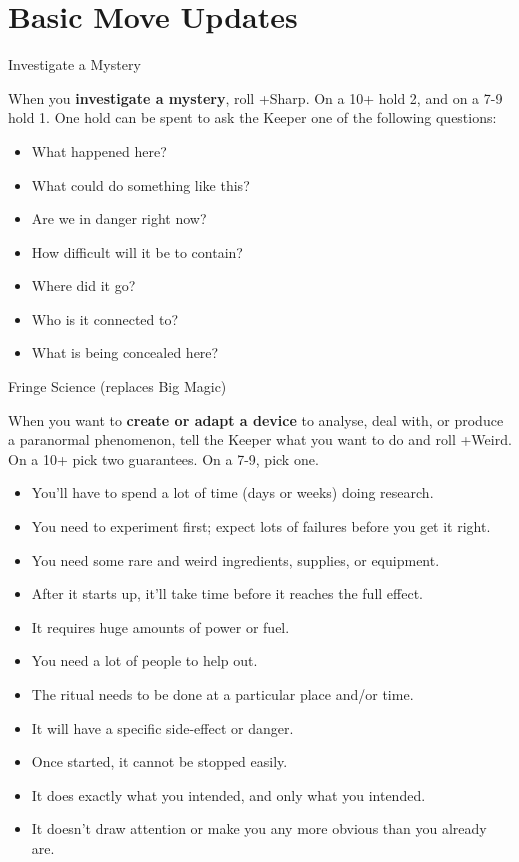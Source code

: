 \documentclass[12pt,oneside,landscape]{memoir}
\begin{document}
\chapter*{Basic Move Updates}
\begin{multicols}{4}
\move
{Investigate a Mystery}
{When you \textbf{investigate a mystery}, roll +Sharp. On a 10+ hold 2, and on a 7-9 hold 1. One hold can be spent to ask the Keeper one of the following questions:
\begin{itemize}
\item What happened here?
\item What could do something like this?
\item Are we in danger right now?
\item How difficult will it be to contain?
\item Where did it go?
\item Who is it connected to?
\item What is being concealed here?
\end{itemize}}


\move
{Fringe Science (replaces Big Magic)}
{When you want to \textbf{create or adapt a device} to analyse, deal with, or produce a paranormal phenomenon, tell the Keeper what you want to do and roll +Weird.  On a 10+ pick two guarantees.  On a 7-9, pick one.
\\[2mm]

\begin{itemize}
\item You’ll have to spend a lot of time (days or weeks) doing research.
\item You need to experiment first; expect lots of failures before you get it right.
\item You need some rare and weird ingredients, supplies, or equipment.
\item After it starts up, it’ll take time before it reaches the full effect.
\item It requires huge amounts of power or fuel.
\item You need a lot of people to help out.
\item The ritual needs to be done at a particular place and/or time.
\item It will have a specific side-effect or danger.
\end{itemize}

\begin{itemize}
\item Once started, it cannot be stopped easily.
\item It does exactly what you intended, and only what you intended.
\item It doesn’t draw attention or make you any more obvious than you already are.
\end{itemize}}


\end{multicols}
\end{document}
